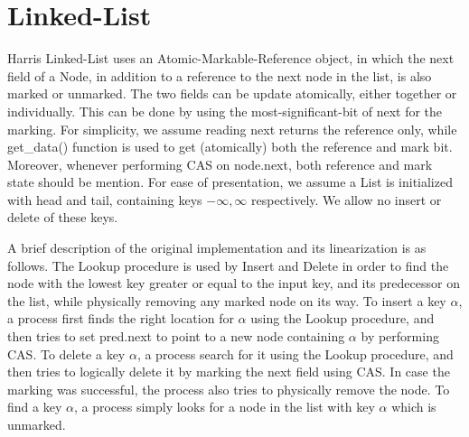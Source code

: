 
\newcommand{\search}{\mbox{\sc Search}}
\newcommand{\recover}{\mbox{\sc Recover}}
\newcommand{\insertlst}{\mbox{\sc Insert}}
\newcommand{\delete}{\mbox{\sc Delete}}
\newcommand{\find}{\mbox{\sc Find}}
\newcommand{\getdata}{\mbox{get\_data()}}


\newcommand{\init}{\mbox{$\bot$}}
\newcommand{\NULL}{\mbox{\sc Null}}
\newcommand{\fail}{\mbox{\sc Fail}}

\newcommand{\Info}{\mbox{Info}}






\section{Linked-List}

Harris Linked-List uses an Atomic-Markable-Reference object, in which the next field of a Node, in addition to a reference to the next node in the list, is also marked or unmarked. The two fields can be update atomically, either together or individually. This can be done by using the most-significant-bit of next for the marking. For simplicity, we assume reading next returns the reference only, while get\_data() function is used to get (atomically) both the reference and mark bit. Moreover, whenever performing CAS on node.next, both reference and mark state should be mention.
For ease of presentation, we assume a List is initialized with head and tail, containing keys $-\infty, \infty$ respectively. We allow no insert or delete of these keys.


A brief description of the original implementation and its linearization is as follows. The Lookup procedure is used by Insert and Delete in order to find the node with the lowest key greater or equal to the input key, and its predecessor on the list, while physically removing any marked node on its way. To insert a key $\alpha$, a process first finds the right location for $\alpha$ using the Lookup procedure, and then tries to set pred.next to point to a new node containing $\alpha$ by performing CAS. To delete a key $\alpha$, a process search for it using the Lookup procedure, and then tries to logically delete it by marking the next field using CAS. In case the marking was successful, the process also tries to physically remove the node. To find a key $\alpha$, a process simply looks for a node in the list with key $\alpha$ which is unmarked.


